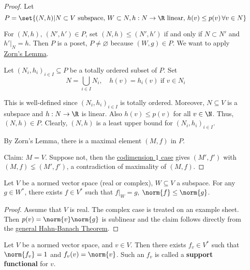 \documentclass{article}
\renewcommand{\emptyset}{\varnothing}
\begin{document}
\begin{proof}
    Let
    \begin{equation*}
        P = \set{(N, h) | N \subset V \text{ subspace}, \, W \subset N, h: N \to \R \text{ linear}, \, h(v) \leq p(v) \, \forall v \in N}
    \end{equation*}

    For $(N, h), \, (N', h') \in P$, set $(N, h) \leq (N', h')$ if and only if $N \subset N'$ and $h' |_N = h$.
    Then $P$ is a poset, $P \neq \emptyset$ because $(W, g) \in P$. We want to apply \hyperlink{lem:zorn}{Zorn's Lemma}.

    Let $(N_i, h_i)_{i \in I} \subseteq P$ be a totally ordered subset of $P$. Set
    \begin{equation*}
        N = \bigcup_{i \in I} N_i, \quad h(v) = h_i(v) \; \text{if } v \in N_i
    \end{equation*}

    This is well-defined since $(N_i, h_i)_{i \in I}$ is totally ordered. Moreover, $N \subseteq V$ is a subspace and $h: N \to \R$ is linear. Also $h(v) \leq p(v)$ for all $v \in \N$. Thus, $(N, h) \in P$. Clearly, $(N, h)$ is a least upper bound for $(N_i, h_i)_{i \in I}$.

    By Zorn's Lemma, there is a maximal element $(M, f)$ in $P$.

    Claim: $M=V$. Suppose not, then the \hyperlink{lem:smallHahn}{codimension $1$ case} gives $(M', f')$ with $(M, f) \lneq (M', f')$, a contradiction of maximality of $(M, f)$.
\end{proof}

\begin{cor}
    Let $V$ be a normed vector space (real or complex), $W \subseteq V$ a subspace.
    For any $g \in W^*$, there exists $f \in V^*$ such that $f |_W = g$, $\norm{f} \leq \norm{g}$.
\end{cor}

\begin{proof}
    Assume that $V$ is real. The complex case is treated on an example sheet.
    Then $p(v) = \norm{v} \norm{g}$ is sublinear and the claim follows directly from the \hyperlink{thm:hahnBanach}{general Hahn-Banach Theorem}.
\end{proof}

\begin{cor}
    Let $V$ be a normed vector space, and $v \in V$.
    Then there exists $f_v \in V^*$ such that $\norm{f_v} = 1$ and $f_v(v) = \norm{v}$.
    Such an $f_v$ is called a \textbf{support functional} for $v$.
\end{cor}
\end{document}
